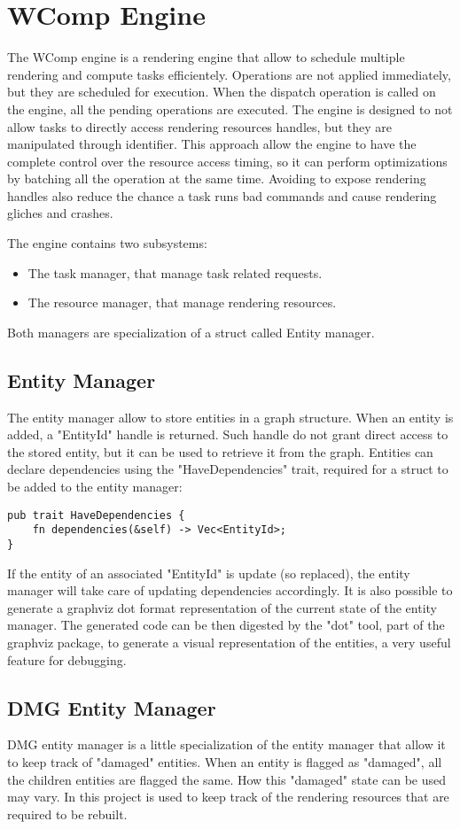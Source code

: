 \chapter{WComp Engine}
The WComp engine is a rendering engine that allow to schedule multiple rendering and compute tasks efficientely. Operations are not applied immediately, but they are scheduled for execution. When the dispatch operation is called on the engine, all the pending operations are executed. The engine is designed to not allow tasks to directly access rendering resources handles, but they are manipulated through identifier. This approach allow the engine to have the complete control over the resource access timing, so it can perform optimizations by batching all the operation at the same time. Avoiding to expose rendering handles also reduce the chance a task runs bad commands and cause rendering gliches and crashes. 

The engine contains two subsystems:
\begin{itemize}
	\item The task manager, that manage task related requests.
	\item The resource manager, that manage rendering resources.
\end{itemize}
Both managers are specialization of a struct called Entity manager.

\newpage
\section{Entity Manager}
The entity manager allow to store entities in a graph structure. When an entity is added, a "EntityId" handle is returned. Such handle do not grant direct access to the stored entity, but it can be used to retrieve it from the graph. Entities can declare dependencies using the "HaveDependencies" trait, required for a struct to be added to the entity manager:
\begin{lstlisting}
pub trait HaveDependencies {
	fn dependencies(&self) -> Vec<EntityId>;
}
\end{lstlisting}
If the entity of an associated "EntityId" is update (so replaced), the entity manager will take care of updating dependencies accordingly. It is also possible to generate a graphviz dot format representation of the current state of the entity manager. The generated code can be then digested by the "dot" tool, part of the graphviz package, to generate a visual representation of the entities, a very useful feature for debugging.
\section{DMG Entity Manager}
DMG entity manager is a little specialization of the entity manager that allow it to keep track of "damaged" entities. When an entity is flagged as "damaged", all the children entities are flagged the same. How this "damaged" state can be used may vary. In this project is used to keep track of the rendering resources that are required to be rebuilt.
\newpage
